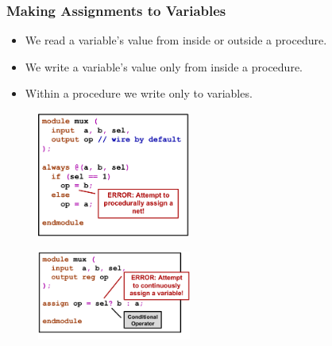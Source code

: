 \documentclass[t, notes, xcolor=table]{beamer}
\begin{document}
\begin{frame}
\frametitle{Making Assignments to Variables}
\begin{itemize}
\item We read a variable's value from inside or outside a procedure.
\item We write a variable's value only from inside a procedure.
\item Within a procedure we write only to variables.
\end{itemize}


\begin{multicols}{2}
\begin{figure}
    \includegraphics[width=0.45\textwidth]{img/04_vars0.png}
\end{figure}
\vfill
\columnbreak

\begin{figure}
    \includegraphics[width=0.45\textwidth]{img/04_vars1.png}
\end{figure}
\end{multicols}

\end{frame}
\end{document}
